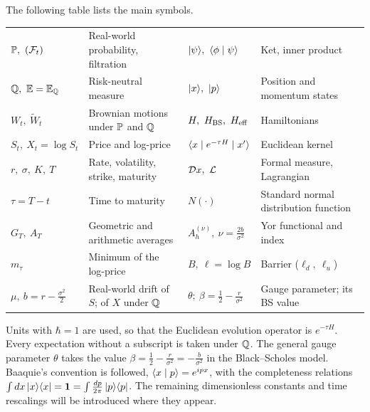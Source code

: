 The following table lists the main symbols.
\begin{center}
\footnotesize
\renewcommand{\arraystretch}{1.15}
\setlength{\tabcolsep}{4pt}
\begin{tabular}{@{}ll|ll@{}}
\toprule
$\PP,\ (\F_t)$ & Real-world probability, filtration &
$\ket{\psi},\ \braket{\phi}{\psi}$ & Ket, inner product \\
$\mathbb{Q},\ \mathbb{E} = \mathbb{E}_{\mathbb{Q}}$ & Risk-neutral measure &
$\ket{x},\ \ket{p}$ & Position and momentum states \\
$W_t,\ \widetilde W_t$ & Brownian motions under $\mathbb{P}$ and $\mathbb{Q}$ &
$H,\ \Hbs,\ \Heff$ & Hamiltonians \\
$S_t,\ X_t = \log S_t$ & Price and log-price &
$\langle x \mid e^{-\tau H} \mid x' \rangle$ & Euclidean kernel \\
$r,\ \sigma,\ K,\ T$ & Rate, volatility, strike, maturity &
$\Dpath x,\ \Lag$ & Formal measure, Lagrangian \\
$\tau = T - t$ & Time to maturity &
$N(\cdot)$ & Standard normal distribution function \\
$G_T,\ A_T$ & Geometric and arithmetic averages &
$A_h^{(\nu)},\ \nu = \frac{2b}{\sigma^2}$ & Yor functional and index \\
$m_\tau$ & Minimum of the log-price &
$B,\ \ell = \log B$ & Barrier ($\ell_d,\ \ell_u$) \\
$\mu,\ b = r - \frac{\sigma^2}{2}$ & Real-world drift of $S$; of $X$ under $\mathbb{Q}$ &
$\theta;\ \beta = \frac{1}{2} - \frac{r}{\sigma^2}$
 & Gauge parameter; its BS value \\
\bottomrule
\end{tabular}
\end{center}

\noindent Units with $\hbar = 1$ are used, so that the Euclidean
evolution operator is $e^{-\tau H}$. Every expectation without a
subscript is taken under $\mathbb{Q}$. The general gauge parameter $\theta$
takes the value
$\beta = \frac{1}{2} - \frac{r}{\sigma^2} = -\frac{b}{\sigma^2}$ in the
Black--Scholes model. Baaquie's convention \cite{baaquie2004} is
followed, $\langle x \mid p \rangle = e^{ipx}$, with the completeness relations
$\int dx\,| x \rangle\langle x | = \mathbf{1} = \int \frac{dp}{2\pi}\,| p \rangle\langle p |$.
The remaining dimensionless constants and time rescalings will be
introduced where they appear.
